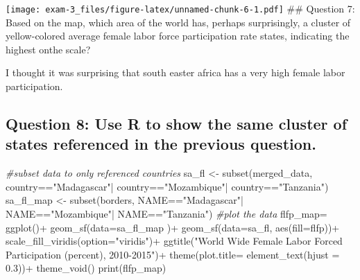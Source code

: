 \documentclass[
]{article}
\newenvironment{Shaded}{\begin{snugshade}}{\end{snugshade}}
\newcommand{\AttributeTok}[1]{\textcolor[rgb]{0.77,0.63,0.00}{#1}}
\newcommand{\CommentTok}[1]{\textcolor[rgb]{0.56,0.35,0.01}{\textit{#1}}}
\newcommand{\FloatTok}[1]{\textcolor[rgb]{0.00,0.00,0.81}{#1}}
\newcommand{\FunctionTok}[1]{\textcolor[rgb]{0.00,0.00,0.00}{#1}}
\newcommand{\NormalTok}[1]{#1}
\newcommand{\OtherTok}[1]{\textcolor[rgb]{0.56,0.35,0.01}{#1}}
\newcommand{\SpecialCharTok}[1]{\textcolor[rgb]{0.00,0.00,0.00}{#1}}
\newcommand{\StringTok}[1]{\textcolor[rgb]{0.31,0.60,0.02}{#1}}
\begin{document}
\texttt{[image: exam-3\_files/figure-latex/unnamed-chunk-6-1.pdf]} \#\#
Question 7: Based on the map, which area of the world has, perhaps
surprisingly, a cluster of yellow-colored average female labor force
participation rate states, indicating the highest onthe scale?

I thought it was surprising that south easter africa has a very high
female labor participation.

\hypertarget{question-8-use-r-to-show-the-same-cluster-of-states-referenced-in-the-previous-question.}{%
\subsection{Question 8: Use R to show the same cluster of states
referenced in the previous
question.}\label{question-8-use-r-to-show-the-same-cluster-of-states-referenced-in-the-previous-question.}}

\begin{Shaded}
\begin{Highlighting}[]
\CommentTok{\#subset data to only referenced countries}
\NormalTok{sa\_fl }\OtherTok{\textless{}{-}} \FunctionTok{subset}\NormalTok{(merged\_data, country}\SpecialCharTok{==}\StringTok{"Madagascar"}\SpecialCharTok{|}\NormalTok{ country}\SpecialCharTok{==}\StringTok{"Mozambique"}\SpecialCharTok{|}\NormalTok{ country}\SpecialCharTok{==}\StringTok{"Tanzania"}\NormalTok{)}
\NormalTok{sa\_fl\_map }\OtherTok{\textless{}{-}} \FunctionTok{subset}\NormalTok{(borders, NAME}\SpecialCharTok{==}\StringTok{"Madagascar"}\SpecialCharTok{|}\NormalTok{ NAME}\SpecialCharTok{==}\StringTok{"Mozambique"}\SpecialCharTok{|}\NormalTok{ NAME}\SpecialCharTok{==}\StringTok{"Tanzania"}\NormalTok{)}
\CommentTok{\#plot the data}
\NormalTok{flfp\_map}\OtherTok{=} \FunctionTok{ggplot}\NormalTok{()}\SpecialCharTok{+}
  \FunctionTok{geom\_sf}\NormalTok{(}\AttributeTok{data=}\NormalTok{sa\_fl\_map )}\SpecialCharTok{+}
  \FunctionTok{geom\_sf}\NormalTok{(}\AttributeTok{data=}\NormalTok{sa\_fl, }\FunctionTok{aes}\NormalTok{(}\AttributeTok{fill=}\NormalTok{flfp))}\SpecialCharTok{+}
  \FunctionTok{scale\_fill\_viridis}\NormalTok{(}\AttributeTok{option=}\StringTok{"viridis"}\NormalTok{)}\SpecialCharTok{+}
  \FunctionTok{ggtitle}\NormalTok{(}\StringTok{"World Wide Female Labor Forced Participation (percent), 2010{-}2015"}\NormalTok{)}\SpecialCharTok{+}
  \FunctionTok{theme}\NormalTok{(}\AttributeTok{plot.title=} \FunctionTok{element\_text}\NormalTok{(}\AttributeTok{hjust =} \FloatTok{0.3}\NormalTok{))}\SpecialCharTok{+}
  \FunctionTok{theme\_void}\NormalTok{()}
\FunctionTok{print}\NormalTok{(flfp\_map)}
\end{Highlighting}
\end{Shaded}
\end{document}
